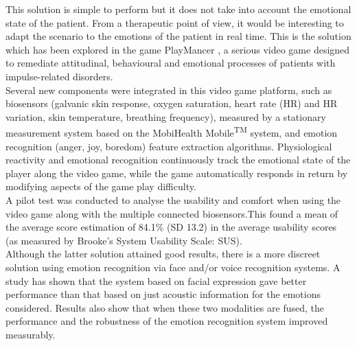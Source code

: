 \documentclass[11pt]{article}
\begin{document}
This solution is simple to perform but it does not take into account the emotional state of the patient. From a therapeutic point of view, it would be interesting to adapt the scenario to the emotions of the patient in real time. This is the solution which has been explored in the game PlayMancer \cite{Fernandez12}, a serious video game designed to remediate attitudinal, behavioural and emotional processes of patients with impulse-related disorders. \\ 

Several new components were integrated in this video game platform, such as biosensors (galvanic skin response, oxygen saturation, heart rate (HR) and HR variation, skin temperature, breathing frequency), measured by a stationary measurement system based on the MobiHealth Mobile\textsuperscript{TM} system, and emotion recognition (anger, joy, boredom) feature extraction algorithms. Physiological reactivity and emotional recognition continuously track the emotional state of the player along the video game, while the game automatically responds in return by modifying aspects of the game play difficulty. \\

A pilot test was conducted to analyse the usability and comfort when using the video game along with the multiple connected biosensors.This found a mean of the average score estimation of 84.1\% (SD 13.2) in the average usability scores (as measured by Brooke's System Usability Scale: SUS). \\

Although the latter solution attained good results, there is a more discreet solution using emotion recognition via face and/or voice recognition systems. A study \cite{Busso04} has shown that the system based on facial expression gave better performance than that based on just acoustic information for the emotions considered. Results also show that when these two modalities are fused, the performance and the robustness of the emotion recognition system improved measurably.
\\
\end{document}
